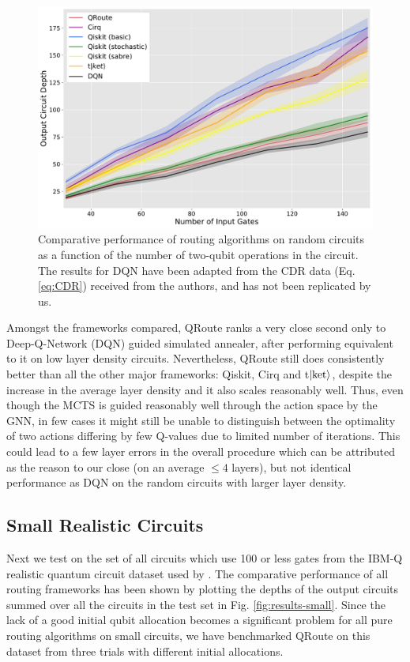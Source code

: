 \documentclass[%
 reprint,
amsmath,amssymb,
pra,
]{revtex4-2}
\begin{document}
\begin{figure}[t]
    \includegraphics[width=\linewidth]{images/random_benchmark.pdf}
    \caption{\label{fig:results-random}
        Comparative performance of routing algorithms on random circuits as a function of the number of two-qubit operations in the circuit. The results for DQN have been adapted from the CDR data (Eq. \ref{eq:CDR}) received from the authors, and has not been replicated by us.}
\end{figure}


Amongst the frameworks compared, QRoute ranks a very close second only to Deep-Q-Network (DQN) guided simulated annealer, after performing equivalent to it on low layer density circuits. Nevertheless, QRoute still does consistently better than all the other major frameworks: Qiskit, Cirq and t$\ket{\text{ket}}$, despite the increase in the average layer density and it also scales reasonably well. Thus,  even though the MCTS is guided reasonably well through the action space by the GNN, in few cases it might still be unable to distinguish between the optimality of two actions differing by few Q-values due to limited number of iterations. This could lead to a few layer errors in the overall procedure which can be attributed as the reason to our close (on an average $\leq4$ layers), but not identical performance as DQN on the random circuits with larger layer density.

\subsection{\label{sec:results-small}Small Realistic Circuits}

Next we test on the set of all circuits which use 100 or less gates from the IBM-Q realistic quantum circuit dataset used by \citet{data_realistic}. The comparative performance of all routing frameworks has been shown by plotting the depths of the output circuits summed over all the circuits in the test set in Fig. \ref{fig:results-small}. Since the lack of a good initial qubit allocation becomes a significant problem for all pure routing algorithms on small circuits, we have benchmarked QRoute on this dataset from three trials with different initial allocations.
\end{document}
